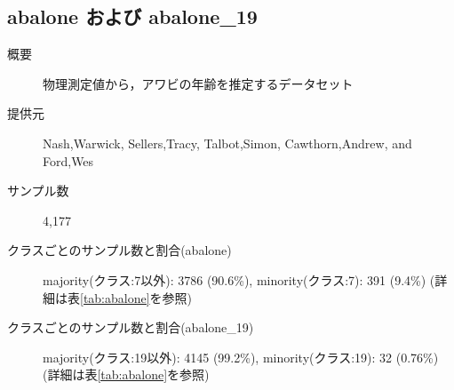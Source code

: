 \subsection{abalone および abalone\_19}
\label{sec:abalone}
\begin{description}
    \item[概要] 物理測定値から，アワビの年齢を推定するデータセット \cite{abalone}
    \item[提供元] Nash,Warwick, Sellers,Tracy, Talbot,Simon, Cawthorn,Andrew, and Ford,Wes
    \item[サンプル数] 4,177
    \item[クラスごとのサンプル数と割合(abalone)] majority(クラス:7以外): 3786 (90.6\%), minority(クラス:7): 391 (9.4\%) (詳細は表\ref{tab:abalone}を参照)
    \item[クラスごとのサンプル数と割合(abalone\_19)] majority(クラス:19以外): 4145 (99.2\%), minority(クラス:19): 32 (0.76\%) (詳細は表\ref{tab:abalone}を参照)


\end{description}
